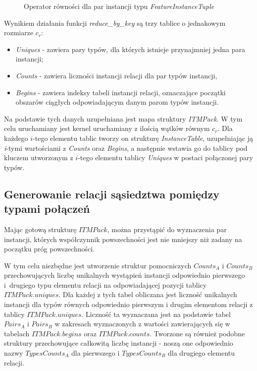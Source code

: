 \documentclass[12pt]{article}
\begin{document}
\begin{figure}[H]
\begin{algorithm}[H]
\caption{Operator równości dla par instancji typu \textit{FeatureInstanceTuple}}
\label{alg:FeatureInstanceTuple_operator}
\end{algorithm}
\end{figure}

Wynikiem działania funkcji \textit{reduce\_by\_key} są trzy tablice o jednakowym rozmiarze $ c_{r} $:
\begin{itemize}
\item \textit{Uniques} - zawiera pary typów, dla których istnieje przynajmniej jedna para instancji;
\item \textit{Counts} - zawiera liczności instancji relacji dla par typów instancji,
\item \textit{Begins} - zawiera indeksy tabeli instancji relacji, oznaczające początki obszarów ciągłych odpowiadającym danym parom typów instancji.
\end{itemize}

Na podstawie tych danych uzupełniana jest mapa struktury \textit{ITMPack}. W tym celu uruchamiany jest kernel uruchamiany z ilością wątków równym $ c_{r} $. Dla każdego $ i $-tego elementu tablic tworzy on strukturę \textit{InstanceTable}, uzupełniając ją \textit{i}-tymi wartościami z \textit{Counts} oraz \textit{Begins}, a następnie wstawia go do tablicy pod kluczem utworzonym z $i$-tego elementu tablicy \textit{Uniques} w postaci połączonej pary typów. 

\subsection{Generowanie relacji sąsiedztwa pomiędzy typami połączeń}

Mając gotową strukturę $ ITMPack $, można przystąpić do wyznaczenia par instancji, których współczynnik powszechności jest nie mniejszy niż zadany na początku próg powszechności. 

W tym celu niezbędne jest utworzenie struktur pomocniczych $ Counts_{A} $ i $ Counts_{B} $ przechowujących liczbę unikalnych wystąpień instancji odpowiednio pierwszego i~drugiego typu elementu relacji na odpowiadającej pozycji tablicy $ ITMPack.uniques $. Dla każdej z tych tabel obliczana jest liczność unikalnych instancji dla typów równych odpowiednio pierwszym i drugim elementom relacji z tablicy \linebreak $ ITMPack.uniques $. Liczność ta wyznaczana jest na podstawie tabel $ Pairs_{A} $ i $ Pairs_{B} $ w zakresach wyznaczonych z wartości zawierających się w tabelach $ ITMPack.begins $ oraz $ ITMPack.counts $. Tworzone są również podobne struktury przechowujące całkowitą liczbę instancji - noszą one odpowiednio nazwy $ TypesCounts_{A} $ dla pierwszego i $ TypesCounts_{B} $ dla drugiego elementu relacji.
\end{document}
